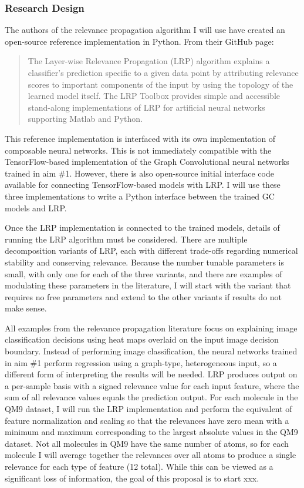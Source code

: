 \documentclass[12pt]{article}
\begin{document}
\subsubsection{Research Design}
\label{sec:org35dc0dd}

The authors of the relevance propagation algorithm I will use have created an open-source reference implementation in Python. From their GitHub page\cite{github:lrp}:

\begin{quote}
The Layer-wise Relevance Propagation (LRP) algorithm explains a classifier's prediction specific to a given data point by attributing relevance scores to important components of the input by using the topology of the learned model itself. The LRP Toolbox provides simple and accessible stand-along implementations of LRP for artificial neural networks supporting Matlab and Python.
\end{quote}

This reference implementation is interfaced with its own implementation of composable neural networks. This is not immediately compatible with the TensorFlow-based implementation of the Graph Convolutional neural networks trained in aim \#1. However, there is also open-source initial interface code available for connecting TensorFlow-based models with LRP\cite{github:lrp_tf,github:lrp_tf2}. I will use these three implementations to write a Python interface between the trained GC models and LRP.

Once the LRP implementation is connected to the trained models, details of running the LRP algorithm must be considered. There are multiple decomposition variants of LRP, each with different trade-offs regarding numerical stability and conserving relevance\cite{Binder2016}. Because the number tunable parameters is small, with only one for each of the three variants, and there are examples of modulating these parameters in the literature, I will start with the variant that requires no free parameters and extend to the other variants if results do not make sense.

All examples from the relevance propagation literature focus on explaining image classification decisions using heat maps overlaid on the input image decision boundary. Instead of performing image classification, the neural networks trained in aim \#1 perform regression using a graph-type, heterogeneous input, so a different form of interpreting the results will be needed. LRP produces output on a per-sample basis with a signed relevance value for each input feature, where the sum of all relevance values equals the prediction output. For each molecule in the QM9 dataset, I will run the LRP implementation and perform the equivalent of feature normalization and scaling so that the relevances have zero mean with a minimum and maximum corresponding to the largest absolute values in the QM9 dataset. Not all molecules in QM9 have the same number of atoms, so for each molecule I will average together the relevances over all atoms to produce a single relevance for each type of feature (12 total). While this can be viewed as a significant loss of information, the goal of this proposal is to start xxx.
\end{document}
